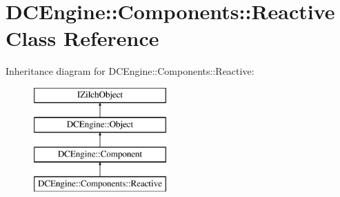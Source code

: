 \hypertarget{classDCEngine_1_1Components_1_1Reactive}{\section{D\-C\-Engine\-:\-:Components\-:\-:Reactive Class Reference}
\label{classDCEngine_1_1Components_1_1Reactive}
}
Inheritance diagram for D\-C\-Engine\-:\-:Components\-:\-:Reactive\-:\begin{figure}[H]
\begin{center}
\leavevmode
\includegraphics[height=4.000000cm]{classDCEngine_1_1Components_1_1Reactive}
\end{center}
\end{figure}

